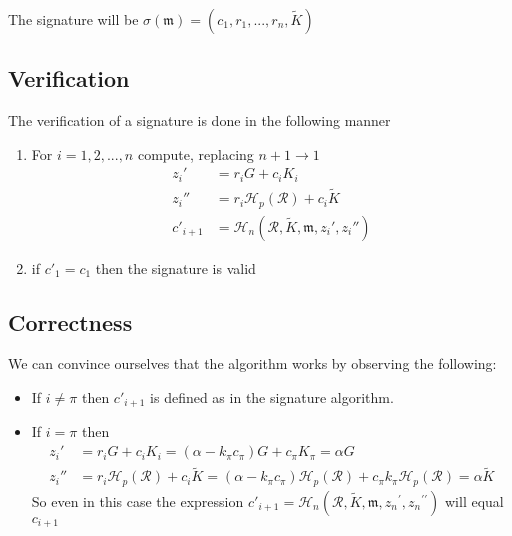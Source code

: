 The signature will be \(\sigma(\mathfrak{m}) = (c_1, r_1, ..., r_n, \tilde{K}) \)

\subsection*{Verification}

The verification of a signature is done in the following manner

\begin{enumerate}
	\item  For \(i = 1, 2, ..., n\) compute, replacing \(n + 1 \rightarrow 1\)
	\begin{align*}
	z_i'       &= r_i G + c_i {K_i} \\
	z_i''      & = r_i \mathcal{H}_p(\mathcal{R}) + c_i \tilde{K} \\
	c'_{i+1}   &= \mathcal{H}_n(\mathcal{R}, \tilde{K}, \mathfrak{m}, {z_i}', {z_i}'')
	\end{align*}
	
	\item if \(c'_1 = c_1\) then the signature is valid
\end{enumerate}



\subsection*{Correctness}

We can convince ourselves that the algorithm works by observing the following:

\begin{itemize}
	
	\item[]If \(i \ne \pi\) then \(c'_{i+1}\) is defined as in the signature algorithm.

	\item[] If \(i = \pi\) then 
	\begin{align*}
	   z_i'  &= r_i G + c_i K_i = (\alpha - k_\pi c_\pi) G + c_\pi K_\pi = \alpha G \\
	   z_i'' &= r_i \mathcal{H}_p(\mathcal{R}) + c_i \tilde{K} = (\alpha - k_\pi c_\pi) \mathcal{H}_p(\mathcal{R}) + c_\pi k_\pi \mathcal{H}_p(\mathcal{R}) =  \alpha \tilde{K}
    \end{align*}
    So even in this case the expression \(c'_{i+1} = \mathcal{H}_n(\mathcal{R}, \tilde{K}, \mathfrak{m}, {z_n}^\prime, {z_n}^{\prime\prime})\) will equal \(c_{i+1}\)
\end{itemize}


